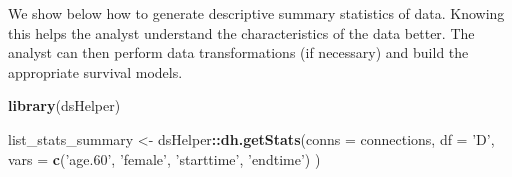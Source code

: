 \documentclass[
]{article}
\newenvironment{Shaded}{\begin{snugshade}}{\end{snugshade}}
\newcommand{\DataTypeTok}[1]{\textcolor[rgb]{0.13,0.29,0.53}{#1}}
\newcommand{\KeywordTok}[1]{\textcolor[rgb]{0.13,0.29,0.53}{\textbf{#1}}}
\newcommand{\NormalTok}[1]{#1}
\newcommand{\OperatorTok}[1]{\textcolor[rgb]{0.81,0.36,0.00}{\textbf{#1}}}
\newcommand{\StringTok}[1]{\textcolor[rgb]{0.31,0.60,0.02}{#1}}
\begin{document}
We show below how to generate descriptive summary statistics of data.
Knowing this helps the analyst understand the characteristics of the
data better. The analyst can then perform data transformations (if
necessary) and build the appropriate survival models.

\begin{Shaded}
\begin{Highlighting}[]
\KeywordTok{library}\NormalTok{(dsHelper)}

\NormalTok{list_stats_summary <-}\StringTok{ }\NormalTok{dsHelper}\OperatorTok{::}\KeywordTok{dh.getStats}\NormalTok{(}\DataTypeTok{conns =}\NormalTok{ connections, }
                                            \DataTypeTok{df =} \StringTok{'D'}\NormalTok{, }
                        \DataTypeTok{vars =} \KeywordTok{c}\NormalTok{(}\StringTok{'age.60'}\NormalTok{, }\StringTok{'female'}\NormalTok{, }\StringTok{'starttime'}\NormalTok{, }\StringTok{'endtime'}\NormalTok{) }
\NormalTok{                        ) }
\end{Highlighting}
\end{Shaded}

\begin{Shaded}
\end{Shaded}
\end{document}
